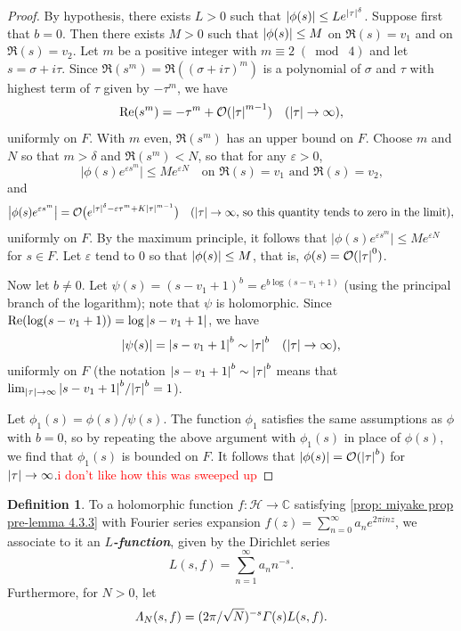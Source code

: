 \documentclass[10pt,leqno,twoside]{article}
\theoremstyle{plain}
\theoremstyle{definition}
\newtheorem{definition/}[lem]{Definition}
\newenvironment{definition}
  {\renewcommand{\qedsymbol}{\textdagger}%
   \pushQED{\qed}\begin{definition/}}
  {\popQED\end{definition/}}
\numberwithin{equation}{section}
\numberwithin{lem}{section}
\newcommand{\textib}[1]{\textbf{\textit{#1\index{#1}}}} %
\newcommand{\smod}[1]{\;(\bmod\; #1)}
\newcommand{\sai}[1]{\textcolor{red}{#1}}
\begin{document}
\begin{proof}
    By hypothesis, there exists $L>0$ such that $\abs{\phi(s)}\leq Le^{\abs{\tau}^\delta}$. Suppose first that $b = 0$. Then there exists $M>0$ such that $\abs{\phi(s)}\leq M$ on $\Re(s) = v_1$ and on $\Re(s) = v_2$. Let $m$ be a positive integer with $m\equiv 2\smod 4$ and let $s = \sigma + i \tau$. Since $\Re(s^m) = \Re((\sigma  + i\tau)^m)$ is a polynomial of $\sigma$ and $\tau$ with highest term of $\tau$ given by $-\tau^m$, we have 
    \[\Re(s^m) = -\tau^m + \mathcal O(\abs{\tau}^{m-1})\quad (\abs{\tau}\to\infty),\] uniformly on $F$. With $m$ even, $\Re(s^m)$ has an upper bound on $F$. Choose $m$ and $N$ so that $m>\delta$ and $\Re(s^m)<N$, so that for any $\varepsilon>0$,
    \[\big|\phi(s)e^{\varepsilon s^m}\big|\leq Me^{\varepsilon N}\quad \text{on $\Re(s) = v_1$ and $\Re(s) = v_2$,}\]
    and
    \[\big|\phi(s)e^{\varepsilon s^m}\big| = \mathcal O\big(e^{\abs{\tau}^\delta -\varepsilon\tau^m + K\abs{\tau}^{m-1}}\big)\quad (\abs{\tau}\to\infty\text{, so this quantity tends to zero in the limit}),\] uniformly on $F$. By the maximum principle, it follows that $\big|\phi(s)e^{\varepsilon s^m}\big|\leq Me^{\varepsilon N}$ for $s\in F$. Let $\varepsilon$ tend to $0$ so that $\abs{\phi(s)}\leq M$, that is, $\phi(s) = \mathcal O(\abs{\tau}^0)$.

    Now let $b\neq 0$. Let $\psi(s) = (s-v_1+1)^b = e^{b\log(s-v_1+1)}$ (using the principal branch of the logarithm); note that $\psi$ is holomorphic. Since $\Re(\log(s-v_1+1)) = \log\abs{s-v_1+1}$, we have 
    \[\abs{\psi(s)} = \abs{s-v_1+1}^b\sim \abs{\tau}^b\quad (\abs{\tau}\to\infty),\] uniformly on $F$ (the notation $\abs{s-v_1+1}^b\sim \abs{\tau}^b$ means that $\lim_{\abs{\tau}\to\infty} \abs{s-v_1+1}^b/\abs{\tau}^b = 1$).

    Let $\phi_1(s) = \phi(s)/\psi(s)$. The function $\phi_1$ satisfies the same assumptions as $\phi$ with $b = 0$, so by repeating the above argument with $\phi_1(s)$ in place of $\phi(s)$, we find that $\phi_1(s)$ is bounded on $F$. It follows that $\abs{\phi(s)} = \mathcal O(\abs{\tau}^b)$ for $\abs{\tau}\to\infty$.\sai{i don't like how this was sweeped up}
\end{proof}
\begin{definition}\label{def: L function}
    To a holomorphic function $f\colon \mathcal H\to \mathbb C$ satisfying \cref{prop: miyake prop pre-lemma 4.3.3}  with Fourier series expansion $f(z) = \sum_{n=0}^\infty a_ne^{2\pi i nz}$, we associate to it an \textib{$L$-function}, given by the Dirichlet series
    \[L(s,f) = \sum_{n=1}^\infty a_nn^{-s}.\] Furthermore, for $N>0$, let 
    \[\varLambda_N(s,f) = (2\pi/\sqrt{N})^{-s}\varGamma(s)L(s,f).\qedhere\]
\end{definition}
\end{document}
